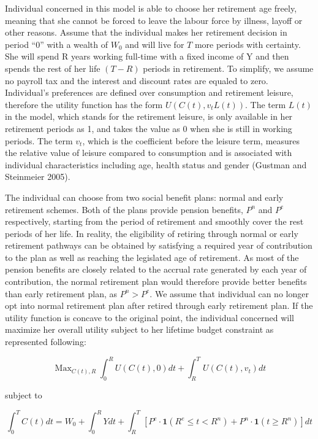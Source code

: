 \documentclass[a4paper]{article}
\begin{document}
Individual concerned in this model is able to choose her retirement age freely, meaning that she cannot be forced to leave the labour force by illness, layoff or other reasons. Assume that the individual makes her retirement decision in period “0” with a wealth of $W_0$ and will live for $T$ more periods with certainty. She will spend R years working full-time with a fixed income of Y and then spends the rest of her life $(T-R)$ periods in retirement. To simplify, we assume no payroll tax and the interest and discount rates are equaled to zero. Individual’s preferences are defined over consumption and retirement leisure, therefore the utility function has the form $U(C(t),v_t L(t))$. The term $L(t)$ in the model, which stands for the retirement leisure, is only available in her retirement periods as 1, and takes the value as 0 when she is still in working periods. The term $v_t$, which is the coefficient before the leisure term, measures the relative value of leisure compared to consumption and is associated with individual characteristics including age, health status and gender (Gustman and Steinmeier 2005).

The individual can choose from two social benefit plans: normal and early retirement schemes. Both of the plans provide pension benefits, $P^n$ and $P^e$ respectively, starting from the period of retirement and smoothly cover the rest periods of her life. In reality, the eligibility of retiring through normal or early retirement pathways can be obtained by satisfying a required year of contribution to the plan as well as reaching the legislated age of retirement. As most of the pension benefits are closely related to the accrual rate generated by each year of contribution, the normal retirement plan would therefore provide better benefits than early retirement plan, as $P^n>P^e$. We assume that individual can no longer opt into normal retirement plan after retired through early retirement plan. If the utility function is concave to the original point, the individual concerned will maximize her overall utility subject to her lifetime budget constraint as represented following:

\begin{equation}
\operatorname{Max}_{C(t), R} \int_{0}^{R} U(C(t), 0) d t+\int_{R}^{T} U\left(C(t), v_{t}\right) d t
\end{equation}

subject to

\begin{equation}
\int_{0}^{T} C(t) d t=W_{0}+\int_{0}^{R} Y d t+\int_{R}^{T}\left[P^{e} \cdot \mathbf{1}\left(R^{e} \leq t<R^{n}\right)+P^{n} \cdot \mathbf{1}\left(t \geq R^{n}\right)\right] d t
\end{equation}
\end{document}
